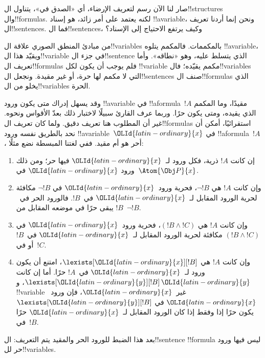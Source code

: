 \documentclass[../../../include/open-logic-section]{subfiles}
\begin{document}


صار لنا الآن رسم لتعريف الإرضاء، أي «الصدق في»، يتناول
ال!!{structure}s وال!!{formula}s. لكنه يعتمد على أمر زائد، هو
إسناد !!a{variable}، ونحن إنما أردنا تعريف ال!!{sentence}s.
فما ال!!{sentence}s، وكيف يرتفع الاحتياج إلى الإسناد؟

من مبادئ المنطق الصوري علاقة ال!!{variable}s بالمكممات. فالمكمم
يتلوه !!a{variable}، ويقيّد هذا ال!!{variable} في جزء
ال!!{sentence} الذي يتسلط عليه، وهو «نطاقه». وأما تعريف
ال!!{formula}s فلم يوجب أن يكون لكل !!{variable} مكمم يقيّده؛
فال!!{variable}s التي لا مكمم لها حرة، أو غير مقيدة. ونجعل
ال!!{sentence}s صنف ال!!{formula}s الذي يخلو من
ال!!{variable}s الحرة.

وقد يسهل إدراك متى يكون ورود !!a{variable} في
!!a{formula}~$!A$ مقيدًا، وما المكمم الذي يقيده، ومتى يكون حرًا.
وربما عرف القارئ سبيلًا لاختبار ذلك بعدّ الأقواس ونحوه. غير أن
المطلوب هنا تعريف دقيق. ولما كان تعريف ال!!{formula}s استقرائيًا،
أمكن أن نحد بالطريق نفسه ورود !!a{variable}~${\OLId{latin-ordinary}{x}}$ في
!!a{formula}~$!A$، أحر هو أم مقيد. ففي لغتنا المبسطة نضع مثلًا:
\begin{enumerate}
  \item إن كانت $!A$ ذرية، فكل ورود لـ~${\OLId{latin-ordinary}{x}}$ فيها حر؛ ومن ذلك ورود
  ${\OLId{latin-ordinary}{x}}$ في~$\Atom{\Obj P}{x}$.
  \item وإن كانت $!A$ هي $\lnot !B$، فحرية ورود~${\OLId{latin-ordinary}{x}}$ في
  $\lnot !B$ مكافئة لحرية الورود المقابل لـ~${\OLId{latin-ordinary}{x}}$ في~$!B$.
  فالورود الحر في~$!B$ يبقى حرًا في موضعه المقابل من~$\lnot !B$.
  \item وإن كانت $!A$ هي $(!B \land !C)$، فحرية ورود~${\OLId{latin-ordinary}{x}}$ في
  $(!B \land !C)$ مكافئة لحرية الورود المقابل لـ~${\OLId{latin-ordinary}{x}}$
  في~$!B$ أو في~$!C$.
  \item وإن كانت $!A$ هي $\lexists[{\OLId{latin-ordinary}{x}}][!B]$، امتنع أن يكون ورود
  لـ~${\OLId{latin-ordinary}{x}}$ في~$!A$ حرًا. أما إن كانت $\lexists[{\OLId{latin-ordinary}{y}}][!B]$، و${\OLId{latin-ordinary}{y}}$
  !!{variable} غير~${\OLId{latin-ordinary}{x}}$، فإن ورود~${\OLId{latin-ordinary}{x}}$ في $\lexists[{\OLId{latin-ordinary}{y}}][!B]$
  يكون حرًا إذا وفقط إذا كان الورود المقابل لـ~${\OLId{latin-ordinary}{x}}$ حرًا في~$!B$.
\end{enumerate}

بعد هذا الضبط للورود الحر والمقيد يتم التعريف: ال!!{sentence}
!!{formula} ليس فيها ورود حر لل!!{variable}s.
\end{document}
